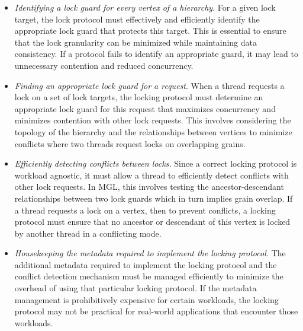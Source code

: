 \begin{itemize}
    \item[\Ra] \emph{Identifying a lock guard for every vertex of a hierarchy}. For a given lock target, the lock protocol must effectively and efficiently identify the appropriate lock guard that protects this target. This is essential to ensure that the lock granularity can be minimized while maintaining data consistency. If a protocol fails to identify an appropriate guard, it may lead to unnecessary contention and reduced concurrency.

    \item[\Rb] \emph{Finding an appropriate lock guard for a request}. When a thread requests a lock on a set of lock targets, the locking protocol must determine an appropriate lock guard for this request that maximizes concurrency and minimizes contention with other lock requests. This involves considering the topology of the hierarchy and the relationships between vertices to minimize conflicts where two threads request locks on overlapping grains.
    
    \item[\Rc] \emph{Efficiently detecting conflicts between locks.} Since a correct locking protocol is workload agnostic, it must allow a thread to efficiently detect conflicts with other lock requests. In MGL, this involves testing the ancestor-descendant relationships between two lock guards which in turn implies grain overlap. If a thread requests a lock on a vertex, then to prevent conflicts, a locking protocol must ensure that no ancestor or descendant of this vertex is locked by another thread in a conflicting mode. 
    
    \item[\Rd] \emph{Housekeeping the metadata required to implement the locking protocol.} The additional metadata required to implement the locking protocol and the conflict detection mechanism must be managed efficiently to minimize the overhead of using that particular locking protocol. If the metadata management is prohibitively expensive for certain workloads, the locking protocol may not be practical for real-world applications that encounter those workloads. 
\end{itemize}



